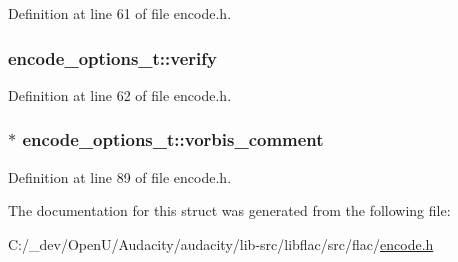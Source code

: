 Definition at line 61 of file encode.\+h.

\subsubsection[{\texorpdfstring{verify}{verify}}]{ encode\+\_\+options\+\_\+t\+::verify}\hypertarget{structencode__options__t_ac4fc520062f68387a24829a8adf87e4e}{}\label{structencode__options__t_ac4fc520062f68387a24829a8adf87e4e}


Definition at line 62 of file encode.\+h.

\subsubsection[{\texorpdfstring{vorbis\+\_\+comment}{vorbis_comment}}]{$\ast$ encode\+\_\+options\+\_\+t\+::vorbis\+\_\+comment}\hypertarget{structencode__options__t_addada80e621edba0db98bb00c2cd5fa0}{}\label{structencode__options__t_addada80e621edba0db98bb00c2cd5fa0}


Definition at line 89 of file encode.\+h.



The documentation for this struct was generated from the following file\+:\begin{DoxyCompactItemize}
\item 
C\+:/\+\_\+dev/\+Open\+U/\+Audacity/audacity/lib-\/src/libflac/src/flac/\hyperlink{libflac_2src_2flac_2encode_8h}{encode.\+h}\end{DoxyCompactItemize}
